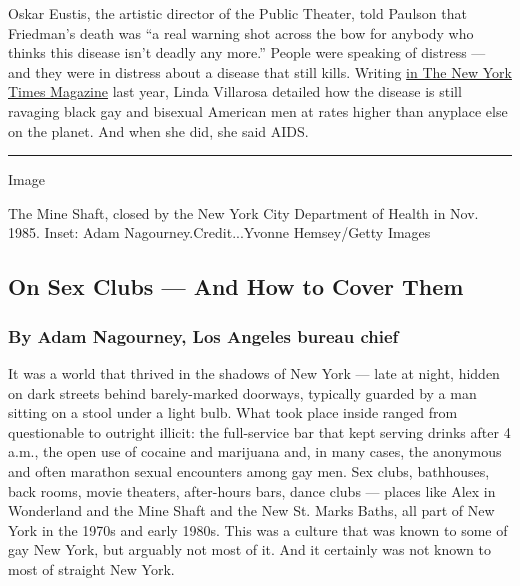 Oskar Eustis, the artistic director of the Public Theater, told Paulson
that Friedman's death was ``a real warning shot across the bow for
anybody who thinks this disease isn't deadly any more.'' People were
speaking of distress --- and they were in distress about a disease that
still kills. Writing
\href{https://www.nytimes3xbfgragh.onion/2017/06/06/magazine/americas-hidden-hiv-epidemic.html}{in
The New York Times Magazine} last year, Linda Villarosa detailed how the
disease is still ravaging black gay and bisexual American men at rates
higher than anyplace else on the planet. And when she did, she said
AIDS.

\begin{center}\rule{0.5\linewidth}{\linethickness}\end{center}

Image

The Mine Shaft, closed by the New York City Department of Health in Nov.
1985. Inset: Adam Nagourney.Credit...Yvonne Hemsey/Getty Images

\hypertarget{on-sex-clubs--and-how-to-cover-them}{%
\subsection{On Sex Clubs --- And How to Cover
Them}\label{on-sex-clubs--and-how-to-cover-them}}

\hypertarget{by-adam-nagourney-los-angeles-bureau-chief}{%
\subsubsection{By Adam Nagourney, Los Angeles bureau
chief}\label{by-adam-nagourney-los-angeles-bureau-chief}}

It was a world that thrived in the shadows of New York --- late at
night, hidden on dark streets behind barely-marked doorways, typically
guarded by a man sitting on a stool under a light bulb. What took place
inside ranged from questionable to outright illicit: the full-service
bar that kept serving drinks after 4 a.m., the open use of cocaine and
marijuana and, in many cases, the anonymous and often marathon sexual
encounters among gay men. Sex clubs, bathhouses, back rooms, movie
theaters, after-hours bars, dance clubs --- places like Alex in
Wonderland and the Mine Shaft and the New St. Marks Baths, all part of
New York in the 1970s and early 1980s. This was a culture that was known
to some of gay New York, but arguably not most of it. And it certainly
was not known to most of straight New York.

